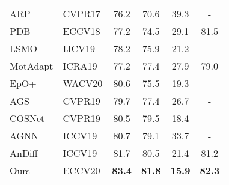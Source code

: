 \documentclass[runningheads]{llncs}
\begin{document}
\begin{table*}[t!]
{\begin{tabular}{l|l|ccc|c}
			ARP \cite{vos_region_aug} &CVPR17 & 76.2  &70.6  &39.3 &-\\
			PDB \cite{vos_pdb} & ECCV18&  77.2 &74.5 &29.1 &81.5\\
			LSMO \cite{vos_lsmo} &IJCV19&78.2&	75.9&  21.2 &-\\
			MotAdapt \cite{motadapt} &ICRA19& 77.2&	77.4&   27.9&79.0\\
			EpO+ \cite{vos_epo}&WACV20&80.6	&	75.5& 19.3 &-\\
			AGS \cite{vos_ags}&		CVPR19 &	79.7&	77.4&	26.7   &-\\
			COSNet \cite{vos_cosnet}	&CVPR19		&80.5&	79.5	&	18.4 &-\\
			AGNN \cite{vos_agnn} & ICCV19 & 80.7 & 79.1&  33.7 &-\\
			AnDiff \cite{vos_andiff}&ICCV19		&	81.7	&80.5&	21.4&81.2\\
			\hline
			Ours &ECCV20 & \textbf{83.4} &\textbf{81.8} &\textbf{15.9}&\textbf{82.3}\\	
			\bottomrule
		\end{tabular}
	}	
	\label{davis16_sota}
\end{table*}
\end{document}
